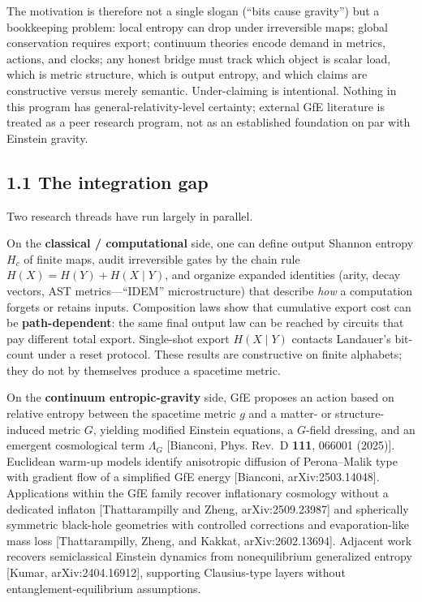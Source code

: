\documentclass[
  11pt,
]{article}
\newcounter{none} %
\begin{document}
The motivation is therefore not a single slogan (``bits cause gravity'') but a bookkeeping problem: local entropy can drop under irreversible maps; global conservation requires export; continuum theories encode demand in metrics, actions, and clocks; any honest bridge must track which object is scalar load, which is metric structure, which is output entropy, and which claims are constructive versus merely semantic. Under-claiming is intentional. Nothing in this program has general-relativity-level certainty; external GfE literature is treated as a peer research program, not as an established foundation on par with Einstein gravity.

\subsection{1.1 The integration gap}\label{the-integration-gap}

Two research threads have run largely in parallel.

On the \textbf{classical / computational} side, one can define output Shannon entropy \(H_c\) of finite maps, audit irreversible gates by the chain rule \(H(X)=H(Y)+H(X\mid Y)\), and organize expanded identities (arity, decay vectors, AST metrics---``IDEM'' microstructure) that describe \emph{how} a computation forgets or retains inputs. Composition laws show that cumulative export cost can be \textbf{path-dependent}: the same final output law can be reached by circuits that pay different total export. Single-shot export \(H(X\mid Y)\) contacts Landauer's bit-count under a reset protocol. These results are constructive on finite alphabets; they do not by themselves produce a spacetime metric.

On the \textbf{continuum entropic-gravity} side, GfE proposes an action based on relative entropy between the spacetime metric \(g\) and a matter- or structure-induced metric \(G\), yielding modified Einstein equations, a \(G\)-field dressing, and an emergent cosmological term \(\Lambda_G\) {[}Bianconi, Phys. Rev.~D \textbf{111}, 066001 (2025){]}. Euclidean warm-up models identify anisotropic diffusion of Perona--Malik type with gradient flow of a simplified GfE energy {[}Bianconi, arXiv:2503.14048{]}. Applications within the GfE family recover inflationary cosmology without a dedicated inflaton {[}Thattarampilly and Zheng, arXiv:2509.23987{]} and spherically symmetric black-hole geometries with controlled corrections and evaporation-like mass loss {[}Thattarampilly, Zheng, and Kakkat, arXiv:2602.13694{]}. Adjacent work recovers semiclassical Einstein dynamics from nonequilibrium generalized entropy {[}Kumar, arXiv:2404.16912{]}, supporting Clausius-type layers without entanglement-equilibrium assumptions.
\end{document}
